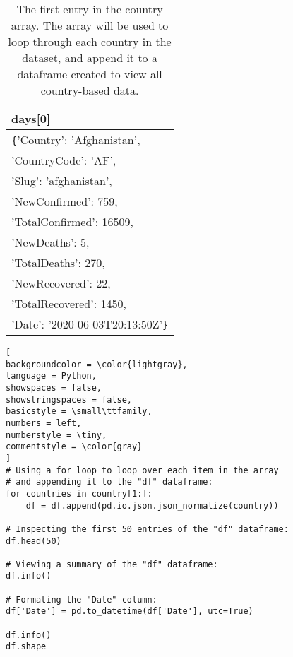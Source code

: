 \documentclass[]{article}
\begin{document}
\begin{table}[!ht]
	\begin{center}
		\caption{The first entry in the country array.  The array will be used to loop through each country in the dataset, and append it to a dataframe created to view all country-based data.}
		\label{tab:table1}
		\begin{tabular}{|l|} 
			\hline
			\textbf{days[0]} \\
			\hline
			\verb|{|'Country': 'Afghanistan',\\
				'CountryCode': 'AF',\\
				'Slug': 'afghanistan',\\
				'NewConfirmed': 759,\\
				'TotalConfirmed': 16509,\\
				'NewDeaths': 5,\\
				'TotalDeaths': 270,\\
				'NewRecovered': 22,\\
				'TotalRecovered': 1450,\\
				'Date': '2020-06-03T20:13:50Z'\verb|}|\\
			\hline
		\end{tabular}
	\end{center}
\end{table}

\begin{lstlisting}[
backgroundcolor = \color{lightgray},
language = Python,
showspaces = false,
showstringspaces = false,
basicstyle = \small\ttfamily,
numbers = left,
numberstyle = \tiny,
commentstyle = \color{gray}
]
# Using a for loop to loop over each item in the array
# and appending it to the "df" dataframe:
for countries in country[1:]:
	df = df.append(pd.io.json.json_normalize(country))

# Inspecting the first 50 entries of the "df" dataframe:
df.head(50)

# Viewing a summary of the "df" dataframe:
df.info()

# Formating the "Date" column:
df['Date'] = pd.to_datetime(df['Date'], utc=True)

df.info()
df.shape
\end{lstlisting}
\end{document}
